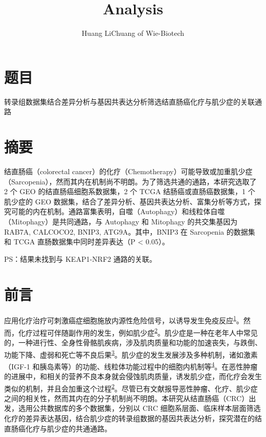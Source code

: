 \documentclass[
]{article}
\title{Analysis}
\author{Huang LiChuang of Wie-Biotech}
\date{}
\begin{document}
\maketitle

{
\setcounter{tocdepth}{3}
\tableofcontents
}
\listoffigures

\listoftables

\hypertarget{ux9898ux76ee}{%
\section{题目}\label{ux9898ux76ee}}

转录组数据集结合差异分析与基因共表达分析筛选结直肠癌化疗与肌少症的关联通路

\hypertarget{abstract}{%
\section{摘要}\label{abstract}}

结直肠癌（colorectal cancer）的化疗（Chemotherapy）可能导致或加重肌少症（Sarcopenia），然而其内在机制尚不明朗。为了筛选共通的通路，本研究选取了 2 个 GEO 的结直肠癌细胞系数据集，2 个 TCGA 结肠癌或直肠癌数据集，1 个 肌少症的 GEO 数据集，结合了差异分析、基因共表达分析、富集分析等方式，探究可能的内在机制。通路富集表明，自噬（Autophagy）和线粒体自噬（Mitophagy）是共同通路，与 Autophagy 和 Mitophagy 的共交集基因为 RAB7A, CALCOCO2, BNIP3, ATG9A。其中，BNIP3 在 Sarcopenia 的数据集和 TCGA 直肠数据集中同时差异表达（P \textless{} 0.05）。

PS：结果未找到与 KEAP1-NRF2 通路的关联。

\hypertarget{introduction}{%
\section{前言}\label{introduction}}

应用化疗治疗可刺激癌症细胞施放内源性危险信号，以诱导发生免疫反应\textsuperscript{\protect\hyperlink{ref-DangerSignalsVargas2017}{1}}。然而，化疗过程可伴随副作用的发生，例如肌少症\textsuperscript{\protect\hyperlink{ref-ChemotherapyInBozzet2020}{2}}。肌少症是一种在老年人中常见的，一种进行性、全身性骨骼肌疾病，涉及肌肉质量和功能的加速丧失，与跌倒、功能下降、虚弱和死亡等不良后果\textsuperscript{\protect\hyperlink{ref-SarcopeniaCruzJ2019}{3}}。肌少症的发生发展涉及多种机制，诸如激素（IGF-1 和胰岛素等）的功能、线粒体功能过程中的细胞内机制等\textsuperscript{\protect\hyperlink{ref-SarcopeniaMoWiedme2021}{4}}。在恶性肿瘤的进展中，和相关的营养不良本身就会侵蚀肌肉质量，诱发肌少症，而化疗会发生类似的机制，并且会加重这个过程\textsuperscript{\protect\hyperlink{ref-ChemotherapyInBozzet2020}{2}}。尽管已有文献报导恶性肿瘤、化疗、肌少症之间的相关性，然而其内在的分子机制尚不明朗。本研究从结直肠癌（CRC）出发，选用公共数据库的多个数据集，分别以 CRC 细胞系层面、临床样本层面筛选化疗的差异表达基因，结合肌少症的转录组数据的基因共表达分析，探究潜在的结直肠癌化疗与肌少症的共通通路。
\end{document}
